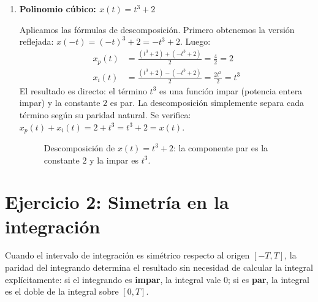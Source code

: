 \documentclass[10pt,a4paper]{article}
\begin{document}
\begin{enumerate}[label=\textbf{\alph*)}]
		\begin{figure}[H]
			\centering
			
			\caption{Componentes de la rampa: valor absoluto (par) y recta (impar).}
		\end{figure}

		\item \textbf{Polinomio cúbico: $x(t) = t^3 + 2$}
		
		Aplicamos las fórmulas de descomposición. Primero obtenemos la versión reflejada: $x(-t) = (-t)^3 + 2 = -t^3 + 2$. Luego:
		\begin{align*}
		    x_p(t) &= \frac{(t^3 + 2) + (-t^3 + 2)}{2} = \frac{4}{2} = 2 \\
		    x_i(t) &= \frac{(t^3 + 2) - (-t^3 + 2)}{2} = \frac{2t^3}{2} = t^3
		\end{align*}
		El resultado es directo: el término $t^3$ es una función impar (potencia entera impar) y la constante $2$ es par. La descomposición simplemente separa cada término según su paridad natural. Se verifica: $x_p(t) + x_i(t) = 2 + t^3 = t^3 + 2 = x(t)$.

		\begin{figure}[H]
			\centering
			
			\caption{Descomposición de $x(t)=t^3+2$: la componente par es la constante $2$ y la impar es $t^3$.}
		\end{figure}
	\end{enumerate}

	\section*{Ejercicio 2: Simetría en la integración}
	
	Cuando el intervalo de integración es simétrico respecto al origen $[-T, T]$, la paridad del integrando determina el resultado sin necesidad de calcular la integral explícitamente: si el integrando es \textbf{impar}, la integral vale $0$; si es \textbf{par}, la integral es el doble de la integral sobre $[0, T]$.
	
\end{document}
